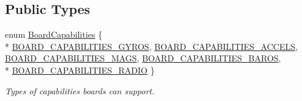 \subsection*{Public Types}
\begin{DoxyCompactItemize}
\item 
enum \hyperlink{group___core_plugin_ga01b09218f2a13aaeee6db007ac6bd967}{Board\-Capabilities} \{ \\*
\hyperlink{group___core_plugin_gga01b09218f2a13aaeee6db007ac6bd967a6490aec954e127f73371f4fb9b457b7c}{B\-O\-A\-R\-D\-\_\-\-C\-A\-P\-A\-B\-I\-L\-I\-T\-I\-E\-S\-\_\-\-G\-Y\-R\-O\-S}, 
\hyperlink{group___core_plugin_gga01b09218f2a13aaeee6db007ac6bd967ac0d0ee8be489c9d3b7b41f1463fea3f3}{B\-O\-A\-R\-D\-\_\-\-C\-A\-P\-A\-B\-I\-L\-I\-T\-I\-E\-S\-\_\-\-A\-C\-C\-E\-L\-S}, 
\hyperlink{group___core_plugin_gga01b09218f2a13aaeee6db007ac6bd967a769644e0a335cd070adf4c24017a462f}{B\-O\-A\-R\-D\-\_\-\-C\-A\-P\-A\-B\-I\-L\-I\-T\-I\-E\-S\-\_\-\-M\-A\-G\-S}, 
\hyperlink{group___core_plugin_gga01b09218f2a13aaeee6db007ac6bd967a9f6c413adaed7f2079e0d2f8097a6d68}{B\-O\-A\-R\-D\-\_\-\-C\-A\-P\-A\-B\-I\-L\-I\-T\-I\-E\-S\-\_\-\-B\-A\-R\-O\-S}, 
\\*
\hyperlink{group___core_plugin_gga01b09218f2a13aaeee6db007ac6bd967a288728a55ec6a807d327586c5d061678}{B\-O\-A\-R\-D\-\_\-\-C\-A\-P\-A\-B\-I\-L\-I\-T\-I\-E\-S\-\_\-\-R\-A\-D\-I\-O}
 \}
\begin{DoxyCompactList}\small\item\em Types of capabilities boards can support. \end{DoxyCompactList}\end{DoxyCompactItemize}
